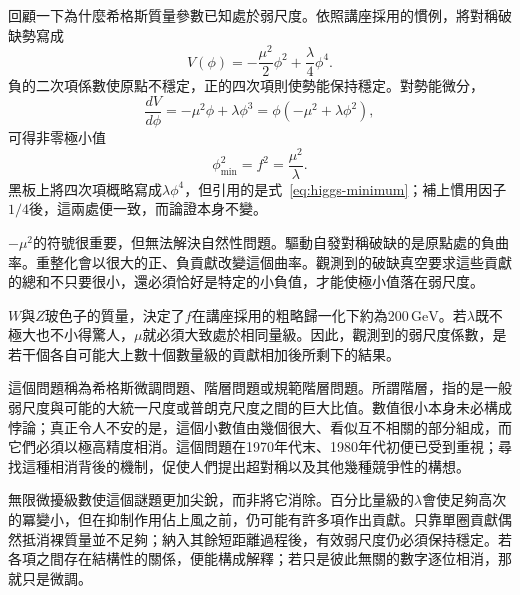 \begin{classroomqa}
\end{classroomqa}

回顧一下為什麼希格斯質量參數已知處於弱尺度。依照講座採用的慣例，將對稱破缺勢寫成
\begin{equation}
V(\phi)=-\frac{\mu^2}{2}\phi^2+\frac{\lambda}{4}\phi^4.
\label{eq:higgs-potential}
\end{equation}
負的二次項係數使原點不穩定，正的四次項則使勢能保持穩定。對勢能微分，
\begin{equation}
\frac{dV}{d\phi}=-\mu^2\phi+\lambda\phi^3
=\phi(-\mu^2+\lambda\phi^2),
\end{equation}
可得非零極小值
\begin{equation}
\phi_{\min}^2=f^2=\frac{\mu^2}{\lambda}.
\label{eq:higgs-minimum}
\end{equation}
黑板上將四次項概略寫成\(\lambda\phi^4\)，但引用的是式~\eqref{eq:higgs-minimum}；補上慣用因子\(1/4\)後，這兩處便一致，而論證本身不變。

\(-\mu^2\)的符號很重要，但無法解決自然性問題。驅動自發對稱破缺的是原點處的負曲率。重整化會以很大的正、負貢獻改變這個曲率。觀測到的破缺真空要求這些貢獻的總和不只要很小，還必須恰好是特定的小負值，才能使極小值落在弱尺度。

\(W\)與\(Z\)玻色子的質量，決定了\(f\)在講座採用的粗略歸一化下約為\(200\,\mathrm{GeV}\)。若\(\lambda\)既不極大也不小得驚人，\(\mu\)就必須大致處於相同量級。因此，觀測到的弱尺度係數，是若干個各自可能大上數十個數量級的貢獻相加後所剩下的結果。

這個問題稱為希格斯微調問題、階層問題或規範階層問題。所謂階層，指的是一般弱尺度與可能的大統一尺度或普朗克尺度之間的巨大比值。數值很小本身未必構成悖論；真正令人不安的是，這個小數值由幾個很大、看似互不相關的部分組成，而它們必須以極高精度相消。這個問題在1970年代末、1980年代初便已受到重視；尋找這種相消背後的機制，促使人們提出超對稱以及其他幾種競爭性的構想。

無限微擾級數使這個謎題更加尖銳，而非將它消除。百分比量級的\(\lambda\)會使足夠高次的冪變小，但在抑制作用佔上風之前，仍可能有許多項作出貢獻。只靠單圈貢獻偶然抵消裸質量並不足夠；納入其餘短距離過程後，有效弱尺度仍必須保持穩定。若各項之間存在結構性的關係，便能構成解釋；若只是彼此無關的數字逐位相消，那就只是微調。

